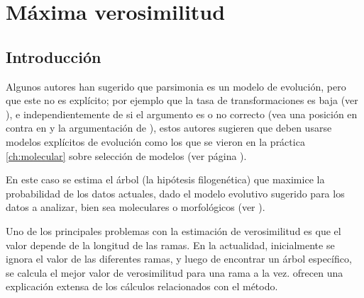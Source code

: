 \chapter{M\'axima verosimilitud}
\section*{Introducci\'on}
\label{ch:likelihood}

Algunos autores han sugerido que parsimonia es un modelo de evoluci\'on, pero que este no es expl\'icito; por ejemplo que la tasa de transformaciones es baja (ver \cite{Swofford1996, Felsenstein2004}), e independientemente de si el argumento es o no correcto (vea una posici\'on en contra en \cite{Farris1983} y la argumentaci\'on de \cite{Steel2002}), estos autores sugieren que deben usarse modelos expl\'icitos de evoluci\'on como los que se vieron en la pr\'actica \ref{ch:molecular} sobre selecci\'on de modelos (ver p\'agina \pageref{ch:molecular}).

En este caso se estima el \'arbol (la hip\'otesis filogen\'etica) que maximice
la probabilidad de los datos actuales, dado el modelo evolutivo sugerido para
los datos a  analizar, bien sea moleculares o morfol\'ogicos (ver \cite{Lewis2001}).

Uno de los principales problemas con la estimaci\'on de verosimilitud es que el
valor depende de la longitud de las ramas. En la actualidad, inicialmente se ignora el valor de las diferentes ramas, y luego de encontrar un \'arbol espec\'ifico, se calcula el mejor valor de verosimilitud para una rama a la vez. \cite{Swofford1996} ofrecen una explicaci\'on extensa de los c\'alculos relacionados con el m\'etodo.


